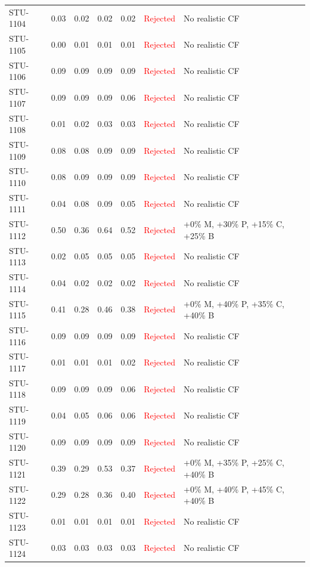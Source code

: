 \begin{longtable}{l c c c c | c | l}
STU-1104 & 0.03 & 0.02 & 0.02 & 0.02 & \textcolor{red}{Rejected} & No realistic CF \\
STU-1105 & 0.00 & 0.01 & 0.01 & 0.01 & \textcolor{red}{Rejected} & No realistic CF \\
STU-1106 & 0.09 & 0.09 & 0.09 & 0.09 & \textcolor{red}{Rejected} & No realistic CF \\
STU-1107 & 0.09 & 0.09 & 0.09 & 0.06 & \textcolor{red}{Rejected} & No realistic CF \\
STU-1108 & 0.01 & 0.02 & 0.03 & 0.03 & \textcolor{red}{Rejected} & No realistic CF \\
STU-1109 & 0.08 & 0.08 & 0.09 & 0.09 & \textcolor{red}{Rejected} & No realistic CF \\
STU-1110 & 0.08 & 0.09 & 0.09 & 0.09 & \textcolor{red}{Rejected} & No realistic CF \\
STU-1111 & 0.04 & 0.08 & 0.09 & 0.05 & \textcolor{red}{Rejected} & No realistic CF \\
STU-1112 & 0.50 & 0.36 & 0.64 & 0.52 & \textcolor{red}{Rejected} & +0\% M, +30\% P, +15\% C, +25\% B \\
STU-1113 & 0.02 & 0.05 & 0.05 & 0.05 & \textcolor{red}{Rejected} & No realistic CF \\
STU-1114 & 0.04 & 0.02 & 0.02 & 0.02 & \textcolor{red}{Rejected} & No realistic CF \\
STU-1115 & 0.41 & 0.28 & 0.46 & 0.38 & \textcolor{red}{Rejected} & +0\% M, +40\% P, +35\% C, +40\% B \\
STU-1116 & 0.09 & 0.09 & 0.09 & 0.09 & \textcolor{red}{Rejected} & No realistic CF \\
STU-1117 & 0.01 & 0.01 & 0.01 & 0.02 & \textcolor{red}{Rejected} & No realistic CF \\
STU-1118 & 0.09 & 0.09 & 0.09 & 0.06 & \textcolor{red}{Rejected} & No realistic CF \\
STU-1119 & 0.04 & 0.05 & 0.06 & 0.06 & \textcolor{red}{Rejected} & No realistic CF \\
STU-1120 & 0.09 & 0.09 & 0.09 & 0.09 & \textcolor{red}{Rejected} & No realistic CF \\
STU-1121 & 0.39 & 0.29 & 0.53 & 0.37 & \textcolor{red}{Rejected} & +0\% M, +35\% P, +25\% C, +40\% B \\
STU-1122 & 0.29 & 0.28 & 0.36 & 0.40 & \textcolor{red}{Rejected} & +0\% M, +40\% P, +45\% C, +40\% B \\
STU-1123 & 0.01 & 0.01 & 0.01 & 0.01 & \textcolor{red}{Rejected} & No realistic CF \\
STU-1124 & 0.03 & 0.03 & 0.03 & 0.03 & \textcolor{red}{Rejected} & No realistic CF \\

\end{longtable}
